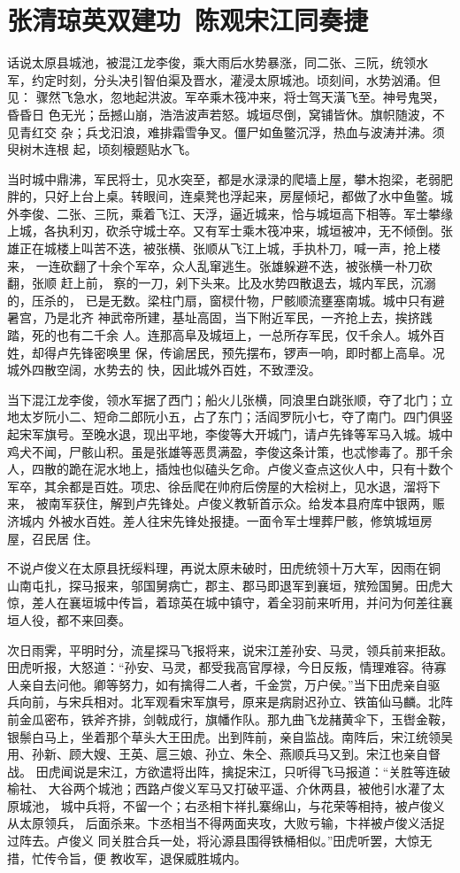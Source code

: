 \chapter{张清琼英双建功~陈观宋江同奏捷}

话说太原县城池，被混江龙李俊，乘大雨后水势暴涨，同二张、三阮，统领水
军，约定时刻，分头决引智伯渠及晋水，灌浸太原城池。顷刻间，水势汹涌。但见：
骤然飞急水，忽地起洪波。军卒乘木筏冲来，将士驾天潢飞至。神号鬼哭，昏昏日
色无光；岳撼山崩，浩浩波声若怒。城垣尽倒，窝铺皆休。旗帜随波，不见青红交
杂；兵戈汩浪，难排霜雪争叉。僵尸如鱼鳖沉浮，热血与波涛并沸。须臾树木连根
起，顷刻榱题贴水飞。

当时城中鼎沸，军民将士，见水突至，都是水渌渌的爬墙上屋，攀木抱梁，老弱肥
胖的，只好上台上桌。转眼间，连桌凳也浮起来，房屋倾圮，都做了水中鱼鳖。城
外李俊、二张、三阮，乘着飞江、天浮，逼近城来，恰与城垣高下相等。军士攀缘
上城，各执利刃，砍杀守城士卒。又有军士乘木筏冲来，城垣被冲，无不倾倒。张
雄正在城楼上叫苦不迭，被张横、张顺从飞江上城，手执朴刀，喊一声，抢上楼来，
一连砍翻了十余个军卒，众人乱窜逃生。张雄躲避不迭，被张横一朴刀砍翻，张顺
赶上前，察的一刀，剁下头来。比及水势四散退去，城内军民，沉溺的，压杀的，
已是无数。梁柱门扇，窗棂什物，尸骸顺流壅塞南城。城中只有避暑宫，乃是北齐
神武帝所建，基址高固，当下附近军民，一齐抢上去，挨挤践踏，死的也有二千余
人。连那高阜及城垣上，一总所存军民，仅千余人。城外百姓，却得卢先锋密唤里
保，传谕居民，预先摆布，锣声一响，即时都上高阜。况城外四散空阔，水势去的
快，因此城外百姓，不致湮没。

当下混江龙李俊，领水军据了西门；船火儿张横，同浪里白跳张顺，夺了北门；立
地太岁阮小二、短命二郎阮小五，占了东门；活阎罗阮小七，夺了南门。四门俱竖
起宋军旗号。至晚水退，现出平地，李俊等大开城门，请卢先锋等军马入城。城中
鸡犬不闻，尸骸山积。虽是张雄等恶贯满盈，李俊这条计策，也忒惨毒了。那千余
人，四散的跪在泥水地上，插烛也似磕头乞命。卢俊义查点这伙人中，只有十数个
军卒，其余都是百姓。项忠、徐岳爬在帅府后傍屋的大桧树上，见水退，溜将下来，
被南军获住，解到卢先锋处。卢俊义教斩首示众。给发本县府库中银两，赈济城内
外被水百姓。差人往宋先锋处报捷。一面令军士埋葬尸骸，修筑城垣房屋，召民居
住。

不说卢俊义在太原县抚绥料理，再说太原未破时，田虎统领十万大军，因雨在铜
山南屯扎，探马报来，邬国舅病亡，郡主、郡马即退军到襄垣，殡殓国舅。田虎大
惊，差人在襄垣城中传旨，着琼英在城中镇守，着全羽前来听用，并问为何差往襄
垣人役，都不来回奏。

次日雨霁，平明时分，流星探马飞报将来，说宋江差孙安、马灵，领兵前来拒敌。
田虎听报，大怒道：“孙安、马灵，都受我高官厚禄，今日反叛，情理难容。待寡
人亲自去问他。卿等努力，如有擒得二人者，千金赏，万户侯。”当下田虎亲自驱
兵向前，与宋兵相对。北军观看宋军旗号，原来是病尉迟孙立、铁笛仙马麟。北阵
前金瓜密布，铁斧齐排，剑戟成行，旗幡作队。那九曲飞龙赭黄伞下，玉辔金鞍，
银鬃白马上，坐着那个草头大王田虎。出到阵前，亲自监战。南阵后，宋江统领吴
用、孙新、顾大嫂、王英、扈三娘、孙立、朱仝、燕顺兵马又到。宋江也亲自督战。
田虎闻说是宋江，方欲遣将出阵，擒捉宋江，只听得飞马报道：“关胜等连破榆社、
大谷两个城池；西路卢俊义军马又打破平遥、介休两县，被他引水灌了太原城池，
城中兵将，不留一个；右丞相卞祥扎寨绵山，与花荣等相持，被卢俊义从太原领兵，
后面杀来。卞丞相当不得两面夹攻，大败亏输，卞祥被卢俊义活捉过阵去。卢俊义
同关胜合兵一处，将沁源县围得铁桶相似。”田虎听罢，大惊无措，忙传令旨，便
教收军，退保威胜城内。

